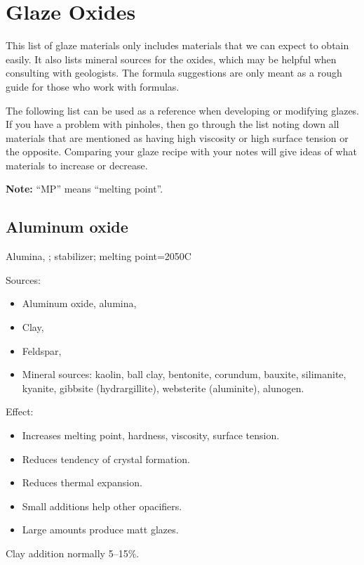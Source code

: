 \chapter{Glaze Oxides}
\label{sec:glazeoxides}
This list of glaze materials only includes materials that we can expect to 
obtain easily. It also lists mineral sources for the oxides, which may be 
helpful when consulting with geologists. The formula suggestions are only meant 
as a rough guide for those who work with formulas.

The following list can be used as a reference when developing or modifying 
glazes. If you have a problem with pinholes, then go through the list noting 
down all materials that are mentioned as having high viscosity or high surface 
tension or the opposite. Comparing your glaze recipe with your notes will give 
ideas of what materials to increase or decrease.

\textbf{Note:} ``MP'' means ``melting point''.
\section{Aluminum oxide}
Alumina, ; stabilizer; melting point=2050\degree C

Sources:
\begin{itemize}
\item Aluminum oxide, alumina, 
\item Clay, 
\item Feldspar, 
\item Mineral sources: kaolin, ball clay, bentonite, corundum, bauxite, 
silimanite, kyanite, gibbsite (hydrargillite), websterite (aluminite), alunogen.
\end{itemize}
Effect:
\begin{itemize}
\item Increases melting point, hardness, viscosity, surface tension.
\item Reduces tendency of crystal formation.
\item Reduces thermal expansion.
\item Small additions help other opacifiers.
\item Large amounts produce matt glazes.
\end{itemize}
Clay addition normally 5--15\%. 

